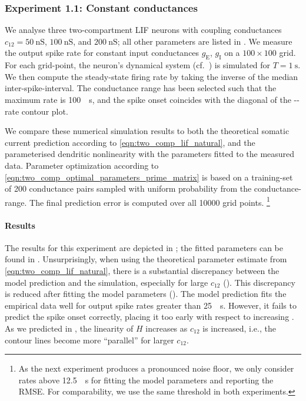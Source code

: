 \subsubsection{Experiment 1.1: Constant conductances}
We analyse three two-compartment LIF neurons with coupling conductances $c_{12} = \SI{50}{\nano\siemens}$, $\SI{100}{\nano\siemens}$, and $\SI{200}{\nano\siemens}$; all other parameters are listed in .
We measure the output spike rate for constant input conductances $g_\mathrm{E}$, $g_\mathrm{I}$ on a $100 \times 100$ grid.
For each grid-point, the neuron's dynamical system (cf.~) is simulated for $T = \SI{1}{\second}$.
We then compute the steady-state firing rate by taking the inverse of the median inter-spike-interval.
The conductance range has been selected such that the maximum rate is \SI{100}{\per\second}, and the spike onset coincides with the diagonal of the \gE-\gI-rate contour plot.

We compare these numerical simulation results to both the theoretical somatic current prediction according to \cref{eqn:two_comp_lif_natural}, and the parameterised dendritic nonlinearity with the parameters fitted to the measured data.
Parameter optimization according to \cref{eqn:two_comp_optimal_parameters_prime_matrix} is based on a training-set of \num{200} conductance pairs sampled with uniform probability from the conductance-range.
The final prediction error is computed over all \num{10000} grid points.%
\footnote{As the next experiment produces a pronounced noise floor, we only consider rates above \SI{12.5}{\per\second} for fitting the model parameters and reporting the RMSE. For comparability, we use the same threshold in both experiments.}

\paragraph{Results}
The results for this experiment are depicted in ; the fitted parameters can be found in .
Unsurprisingly, when using the theoretical parameter estimate from \cref{eqn:two_comp_lif_natural}, there is a substantial discrepancy between the model prediction and the simulation, especially for large $c_{12}$ (). This discrepancy is reduced after fitting the model parameters ().
The model prediction fits the empirical data well for output spike rates greater than \SI{25}{\per\second}.
However, it fails to predict the spike onset correctly, placing it too early with respect to increasing \gE.
As we predicted in , the linearity of $H$ increases as $c_{12}$ is increased, i.e., the contour lines become more \enquote{parallel} for larger $c_{12}$.

